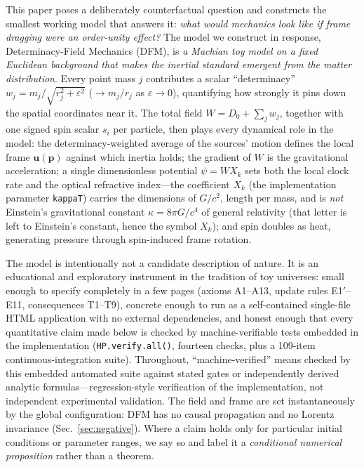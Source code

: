 \documentclass[aps,reprint,amsmath,amssymb,nofootinbib,superscriptaddress,floatfix]{revtex4-2}
\newcommand{\vect}[1]{\bm{#1}}
\newcommand{\Kt}{X_k}
\newcommand{\Dz}{D_0}
\begin{document}
This paper poses a deliberately counterfactual question and constructs
the smallest working model that answers it:
\emph{what would mechanics look like if frame dragging were an
order-unity effect?}
The model we construct in response, Determinacy-Field Mechanics (DFM),
is
\emph{a Machian toy model on a fixed Euclidean background that makes the
inertial standard emergent from the matter distribution}.
Every point mass $j$ contributes a scalar ``determinacy''
$w_j = m_j/\sqrt{r_j^2+\varepsilon^2}$ ($\to m_j/r_j$ as
$\varepsilon \to 0$), quantifying how strongly it pins down the spatial
coordinates near it.
The total field $W = \Dz + \sum_j w_j$, together with one signed spin
scalar $s_i$ per particle, then plays every dynamical role in the model:
the determinacy-weighted average of the sources' motion defines the
local frame $\vect{u}(\vect{p})$ against which inertia holds; the
gradient of $W$ is the gravitational acceleration; a single
dimensionless potential $\psi = W\Kt$ sets both the local clock
rate and the optical refractive index---the coefficient $\Kt$ (the
implementation parameter \texttt{kappaT}) carries the dimensions of
$G/c^2$, length per mass, and is \emph{not} Einstein's gravitational
constant $\kappa = 8\pi G/c^4$ of general relativity (that letter is left
to Einstein's constant, hence the symbol $\Kt$); and spin doubles as heat, generating
pressure through spin-induced frame rotation.

The model is intentionally not a candidate description of nature.
It is an educational and exploratory instrument in the tradition of
toy universes: small enough to specify completely in a few pages
(axioms A1--A13, update rules E1$'$--E11, consequences T1--T9),
concrete enough to run as a self-contained single-file HTML application
with no external dependencies, and honest enough that every quantitative
claim made below is checked by machine-verifiable tests embedded in the
implementation (\texttt{HP.verify.all()}, fourteen checks, plus a
109-item continuous-integration suite).
Throughout, ``machine-verified'' means checked by this embedded
automated suite against stated gates or independently derived analytic
formulas---regression-style verification of the implementation, not
independent experimental validation.
The field and frame are set instantaneously by the global
configuration: DFM has no causal propagation and no Lorentz
invariance (Sec.~\ref{sec:negative}).
Where a claim holds only for particular initial conditions or parameter
ranges, we say so and label it a \emph{conditional numerical
proposition} rather than a theorem.
\end{document}
